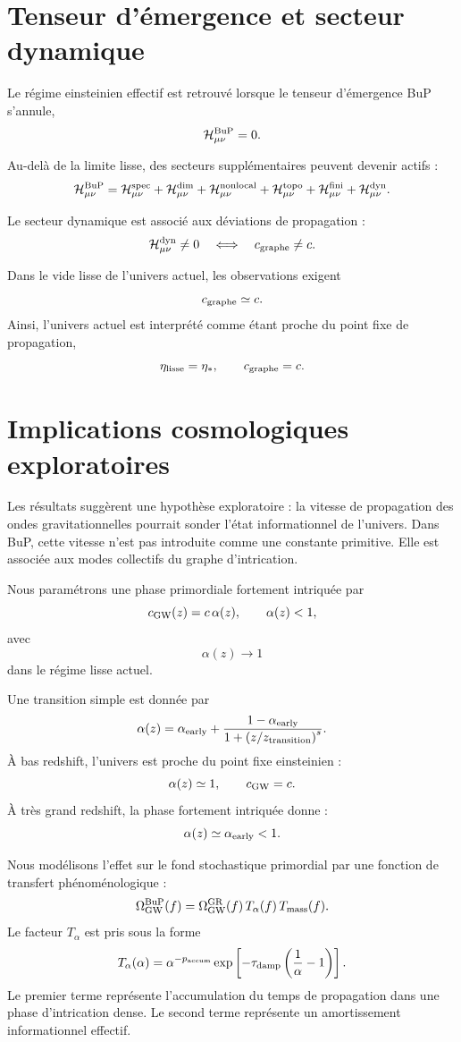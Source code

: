 \documentclass[11pt,a4paper]{article}
\begin{document}
\section{Tenseur d'émergence et secteur dynamique}

Le régime einsteinien effectif est retrouvé lorsque le tenseur d'émergence BuP
s'annule,
\[
\mathcal H_{\mu\nu}^{\rm BuP} = 0.
\]

Au-delà de la limite lisse, des secteurs supplémentaires peuvent devenir actifs :
\[
\mathcal H_{\mu\nu}^{\rm BuP}
=
\mathcal H_{\mu\nu}^{\rm spec}
+
\mathcal H_{\mu\nu}^{\rm dim}
+
\mathcal H_{\mu\nu}^{\rm nonlocal}
+
\mathcal H_{\mu\nu}^{\rm topo}
+
\mathcal H_{\mu\nu}^{\rm fini}
+
\mathcal H_{\mu\nu}^{\rm dyn}.
\]

Le secteur dynamique est associé aux déviations de propagation :
\[
\mathcal H_{\mu\nu}^{\rm dyn} \neq 0
\quad\Longleftrightarrow\quad
c_{\rm graphe} \neq c.
\]

Dans le vide lisse de l'univers actuel, les observations exigent
\[
c_{\rm graphe} \simeq c.
\]
Ainsi, l'univers actuel est interprété comme étant proche du point fixe de
propagation,
\[
\eta_{\rm lisse} = \eta_\ast,
\qquad
c_{\rm graphe} = c.
\]

\section{Implications cosmologiques exploratoires}

Les résultats suggèrent une hypothèse exploratoire : la vitesse de propagation
des ondes gravitationnelles pourrait sonder l'état informationnel de l'univers.
Dans BuP, cette vitesse n'est pas introduite comme une constante primitive.
Elle est associée aux modes collectifs du graphe d'intrication.

Nous paramétrons une phase primordiale fortement intriquée par
\[
c_{\rm GW}(z) = c\,\alpha(z), \qquad \alpha(z) < 1,
\]
avec
\[
\alpha(z) \to 1
\]
dans le régime lisse actuel.

Une transition simple est donnée par
\[
\alpha(z)
=
\alpha_{\rm early}
+
\frac{1-\alpha_{\rm early}}
{1+\left(z/z_{\rm transition}\right)^s}.
\]
À bas redshift, l'univers est proche du point fixe einsteinien :
\[
\alpha(z) \simeq 1, \qquad c_{\rm GW} = c.
\]
À très grand redshift, la phase fortement intriquée donne :
\[
\alpha(z) \simeq \alpha_{\rm early} < 1.
\]

Nous modélisons l'effet sur le fond stochastique primordial par une fonction de
transfert phénoménologique :
\[
\Omega_{\rm GW}^{\rm BuP}(f)
=
\Omega_{\rm GW}^{\rm GR}(f) \, T_\alpha(f) \, T_{\rm mass}(f).
\]
Le facteur \(T_\alpha\) est pris sous la forme
\[
T_\alpha(\alpha)
=
\alpha^{-p_{\rm accum}}
\exp\left[
-\tau_{\rm damp}
\left(
\frac{1}{\alpha}-1
\right)
\right].
\]
Le premier terme représente l'accumulation du temps de propagation dans une
phase d'intrication dense. Le second terme représente un amortissement
informationnel effectif.
\end{document}
